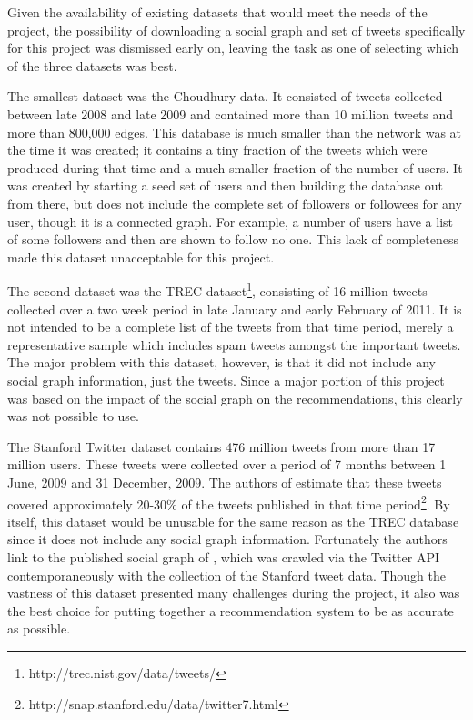 Given the availability of existing datasets that would meet the needs of the project, the possibility of downloading a social graph and set of tweets specifically for this project was dismissed early on, leaving the task as one of selecting which of the three datasets was best.

The smallest dataset was the Choudhury data. It consisted of tweets collected between late 2008 and late 2009 and contained more than 10 million tweets and more than 800,000 edges. This database is much smaller than the network was at the time it was created; it contains a tiny fraction of the tweets which were produced during that time and a much smaller fraction of the number of users. It was created by starting a seed set of users and then building the database out from there, but does not include the complete set of followers or followees for any user, though it is a connected graph. For example, a number of users have a list of some followers and then are shown to follow no one. This lack of completeness made this dataset unacceptable for this project.

The second dataset was the TREC dataset\footnote{http://trec.nist.gov/data/tweets/}, consisting of 16 million tweets collected over a two week period in late January and early February of 2011. It is not intended to be a complete list of the tweets from that time period, merely a representative sample which includes spam tweets amongst the important tweets. The major problem with this dataset, however, is that it did not include any social graph information, just the tweets. Since a major portion of this project was based on the impact of the social graph on the recommendations, this clearly was not possible to use.

The Stanford Twitter dataset contains 476 million tweets from more than 17 million users. These tweets were collected over a period of 7 months between 1 June, 2009 and 31 December, 2009. The authors of \cite{Yang2011} estimate that these tweets covered approximately 20-30\% of the tweets published in that time period\footnote{http://snap.stanford.edu/data/twitter7.html}. By itself, this dataset would be unusable for the same reason as the TREC database since it does not include any social graph information. Fortunately the authors link to the published social graph of \cite{Kwak2010}, which was crawled via the Twitter API contemporaneously with the collection of the Stanford tweet data. Though the vastness of this dataset presented many challenges during the project, it also was the best choice for putting together a recommendation system to be as accurate as possible.

